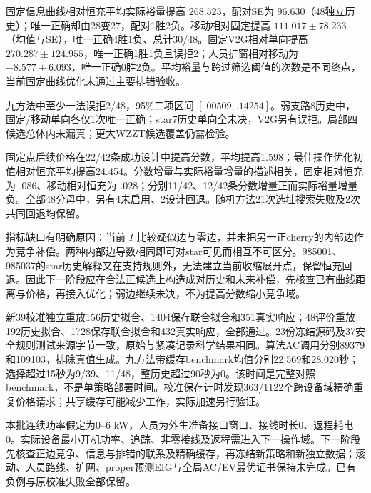 固定信息曲线相对恒充平均实际裕量提高 $268.523$，配对SE为 $96.630$（48独立历史）；唯一正确却由28变27，配对1胜2负。移动相对固定提高 $111.017\pm78.233$（均值与SE），唯一正确4胜1负、总计30/48。固定V2G相对单向提高 $270.287\pm124.955$，唯一正确1胜1负且误拒2；人员扩窗相对移动为 $-8.577\pm6.093$，唯一正确0胜2负。平均裕量与跨过筛选阈值的次数是不同终点，当前固定曲线优化未通过主要排错验收。

九方法中至少一法误拒2/48，95\%二项区间 $[.00509,.14254]$。弱支路8历史中，固定/移动单向各仅1次唯一正确；star7历史单向全未决，V2G另有误拒。局部四候选总体内未漏真；更大WZZT候选覆盖仍需检验。

固定点后续价格在22/42条成功设计中提高分数，平均提高1.598；最佳操作优化初值相对恒充平均提高24.454。分数增量与实际裕量增量的描述相关，固定相对恒充为 $.086$、移动相对恒充为 $.028$；分别11/42、12/42条分数增量正而实际裕量增量负。全部48分母中，另有4未启用、2设计回退。随机方法21次选址搜索失败及2次共同回退均保留。

指标缺口有明确原因：当前 $I$ 比较疑似边与零边，并未把另一正cherry的内部边作为竞争补偿。两种内部边导数相同即可对star可见而相互不可区分。985001、985037的star历史解释又在支持规则外，无法建立当前收缩展开点，保留恒充回退。因此下一阶段应在合法正候选上构造成对历史和未来补偿，先核查已有曲线距离与价格，再接入优化；弱边继续未决，不为提高分数缩小竞争域。

新39校准独立重放156历史拟合、1404保存联合拟合和351真实响应；48评价重放192历史拟合、1728保存联合拟合和432真实响应，全部通过。23份冻结源码及37安全规则测试来源字节一致，原始与紧凑记录科学结果相同。算法AC调用分别89379和109103，排除真值生成。九方法带缓存benchmark均值分别22.569和28.020秒；选择超过15秒为9/39、11/48，整历史超过90秒为0。该时间是完整对照benchmark，不是单策略部署时间。校准保存计时发现363/1122个跨设备域精确重复价格请求；共享缓存可能减少工作，实际加速另行验证。

本批连续功率假定为0--6 kW，人员为外生准备接口窗口、接线时长0、返程耗电0。实际设备最小开机功率、追踪、非零接线及返程需进入下一操作域。下一阶段先核查正边竞争、信息与排错的联系及精确缓存，再冻结新策略和新独立数据；滚动、人员路线、扩网、proper预测EIG与全局AC/EV最优证书保持未完成。已有负例与原校准失败全部保留。
